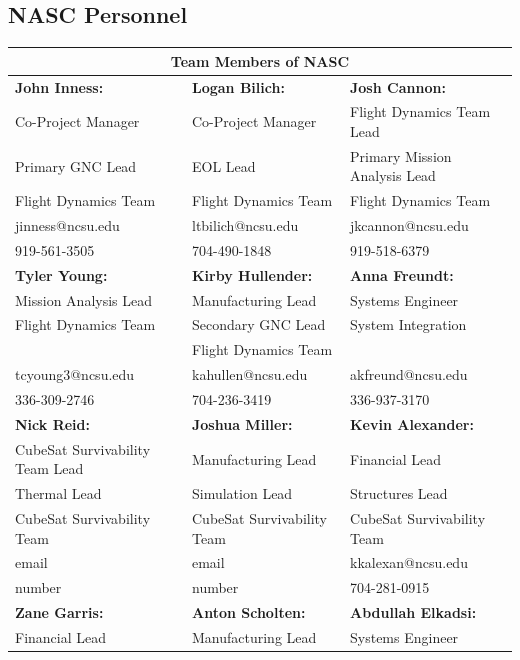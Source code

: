 \subsection{NASC Personnel}
%
\begin{center}
\begin{tabular}{|p{5.3cm}||p{5.3cm}||p{5.3cm}|}
\hline
 \multicolumn{3}{|c|}{Team Members of NASC} \\
 \hline %
 \textbf{John Inness:}&  \textbf{Logan Bilich: }& \textbf{Josh Cannon: }\\ 
 Co-Project Manager   & Co-Project Manager & Flight Dynamics Team Lead   \\
 Primary GNC Lead & EOL Lead & Primary Mission Analysis Lead \\
 Flight Dynamics Team  & Flight Dynamics Team  & Flight Dynamics Team  \\
 jinness@ncsu.edu   & ltbilich@ncsu.edu   & jkcannon@ncsu.edu \\
 919-561-3505  & 704-490-1848 & 919-518-6379 \\
\hline %
 \textbf{Tyler Young: } &  \textbf{Kirby Hullender:} & \textbf{Anna Freundt:}\\ 
  Mission Analysis Lead  & Manufacturing Lead & Systems Engineer   \\
Flight Dynamics Team  & Secondary GNC Lead & System Integration \\
 & Flight Dynamics Team &  \\
 tcyoung3@ncsu.edu   & kahullen@ncsu.edu & akfreund@ncsu.edu  \\
 336-309-2746  & 704-236-3419  & 336-937-3170\\
 \hline %
 \textbf{Nick Reid: }&  \textbf{Joshua Miller: }& \textbf{Kevin Alexander: }\\ 
 CubeSat Survivability Team Lead   & Manufacturing Lead & Financial Lead   \\
 Thermal Lead & Simulation Lead & Structures Lead \\
 CubeSat Survivability Team  & CubeSat Survivability Team  & CubeSat Survivability Team  \\
 email   & email & kkalexan@ncsu.edu  \\
 number  & number & 704-281-0915 \\
 \hline %
 \textbf{Zane Garris: }&  \textbf{Anton Scholten: }& \textbf{Abdullah Elkadsi:}\\ 
 Financial Lead   & Manufacturing Lead & Systems Engineer    \\

\end{tabular}
\end{center}
